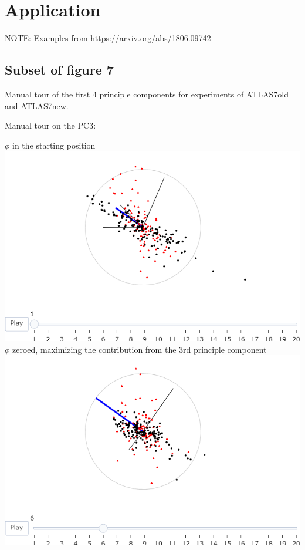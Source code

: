 \documentclass{monashthesis}
\begin{document}
\hypertarget{sec:application}{%
\section{Application}\label{sec:application}}

NOTE: Examples from \url{https://arxiv.org/abs/1806.09742}
\textcite{cook_dynamical_2018}

\hypertarget{subset-of-figure-7}{%
\subsection{Subset of figure 7}\label{subset-of-figure-7}}

Manual tour of the first 4 principle components for experiments of ATLAS7old and ATLAS7new.

Manual tour on the PC3:

\(\phi\) in the starting position
\includegraphics{./output/fig7_phi_start.png}
\(\phi\) zeroed, maximizing the contribution from the 3rd principle component
\includegraphics{./output/fig7_phi0.png}
\end{document}
